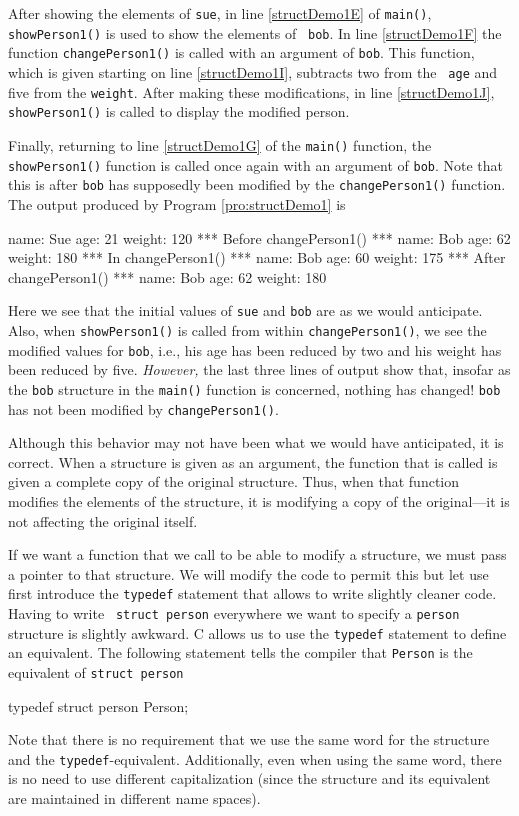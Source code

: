 After showing the elements of {\tt sue}, in line \ref{structDemo1E} of
{\tt main()}, {\tt showPerson1()} is used to show the elements of {\tt
  bob}.  In line \ref{structDemo1F} the function {\tt changePerson1()}
is called with an argument of {\tt bob}.  This function, which is
given starting on line \ref{structDemo1I}, subtracts two from the {\tt
  age} and five from the {\tt weight}.  After making these
modifications, in line \ref{structDemo1J}, {\tt showPerson1()} is
called to display the modified person.

Finally, returning to line \ref{structDemo1G} of the {\tt main()}
function, the {\tt showPerson1()} function is called once again with an
argument of {\tt bob}.  Note that this is after {\tt bob} has
supposedly been modified by the {\tt changePerson1()} function.  The
output produced by Program \ref{pro:structDemo1} is
\begin{code}
name: Sue
age: 21
weight: 120
*** Before changePerson1() ***
name: Bob
age: 62
weight: 180
*** In changePerson1() ***
name: Bob
age: 60
weight: 175
*** After changePerson1() ***
name: Bob
age: 62
weight: 180
\end{code}
Here we see that the initial values of {\tt sue} and {\tt bob} are as
we would anticipate.  Also, when {\tt showPerson1()} is called from
within {\tt changePerson1()}, we see the modified values for {\tt bob},
i.e., his age has been reduced by two and his weight has been reduced
by five.  {\em However,} the last three lines of output show that,
insofar as the {\tt bob} structure in the {\tt main()} function is
concerned, nothing has changed!  {\tt bob} has not been modified by
{\tt changePerson1()}.  

Although this behavior may not have been what we would have
anticipated, it is correct.  When a structure is given as an argument,
the function that is called is given a complete copy of the original
structure.  Thus, when that function modifies the elements of the
structure, it is modifying a copy of the original---it is not
affecting the original itself.

If we want a function that we call to be able to modify a structure,
we must pass a pointer to that structure.  We will modify the code to
permit this but let use first introduce the {\tt typedef} statement
that allows to write slightly cleaner code.  Having to write {\tt
  struct person} everywhere we want to specify a {\tt person}
structure is slightly awkward.  C allows us to use the {\tt typedef}
statement to define an equivalent.  The following statement tells the
compiler that {\tt Person} is the equivalent of {\tt struct person}
\begin{code}
  typedef struct person Person;
\end{code}
Note that there is no requirement that we use the same word for the
structure and the {\tt typedef}-equivalent.  Additionally, even when
using the same word, there is no need to use different capitalization
(since the structure and its equivalent are maintained in different
name spaces).

